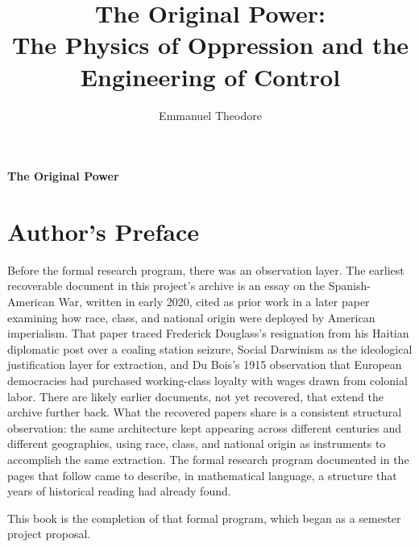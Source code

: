 \documentclass[12pt,openany]{book}
\title{The Original Power:\\The Physics of Oppression and the Engineering of Control}
\author{Emmanuel Theodore}
\date{}
\numberwithin{equation}{chapter}
\begin{document}
\thispagestyle{empty}
\vspace*{\fill}
\begin{center}
{\Huge\bfseries The Original Power}
\end{center}
\vspace*{\fill}
\cleardoublepage

\maketitle

\frontmatter
\tableofcontents
\listoffigures

\chapter*{Author's Preface}

Before the formal research program, there was an observation layer. The earliest recoverable document in this project's archive is an essay on the Spanish-American War, written in early 2020, cited as prior work in a later paper examining how race, class, and national origin were deployed by American imperialism. That paper traced Frederick Douglass's resignation from his Haitian diplomatic post over a coaling station seizure, Social Darwinism as the ideological justification layer for extraction, and Du Bois's 1915 observation that European democracies had purchased working-class loyalty with wages drawn from colonial labor. There are likely earlier documents, not yet recovered, that extend the archive further back. What the recovered papers share is a consistent structural observation: the same architecture kept appearing across different centuries and different geographies, using race, class, and national origin as instruments to accomplish the same extraction. The formal research program documented in the pages that follow came to describe, in mathematical language, a structure that years of historical reading had already found.

This book is the completion of that formal program, which began as a semester project proposal.
\end{document}
